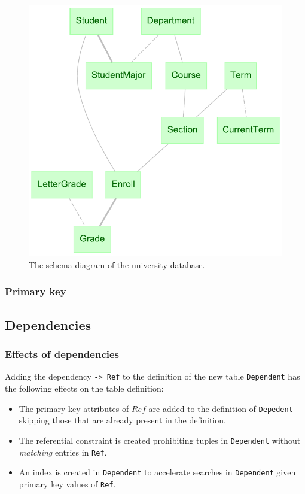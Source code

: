 \documentclass[letter,10pt]{article}
\begin{document}
\begin{figure}
\includegraphics[width=\columnwidth]{uni_erd.pdf}
\caption{The schema diagram of the university database.}
\label{fig:erd}
\end{figure}


\subsubsection{Primary key}

\subsection{Dependencies}
\subsubsection{Effects of dependencies}\label{sec:effects}
Adding the dependency \lstinline$-> Ref$ to the definition of the new table \lstinline$Dependent$ has the following effects on the table definition: 
\begin{itemize}
\item The primary key attributes of $Ref$ are added to the definition of \lstinline$Depedent$ skipping those that are already present in the definition.
\item The referential constraint is created prohibiting tuples in \lstinline$Dependent$ without \emph{matching} entries in \lstinline$Ref$.
\item An index is created in \lstinline$Dependent$ to accelerate searches in \lstinline$Dependent$ given primary key values of \lstinline$Ref$.
\end{itemize}
\end{document}
